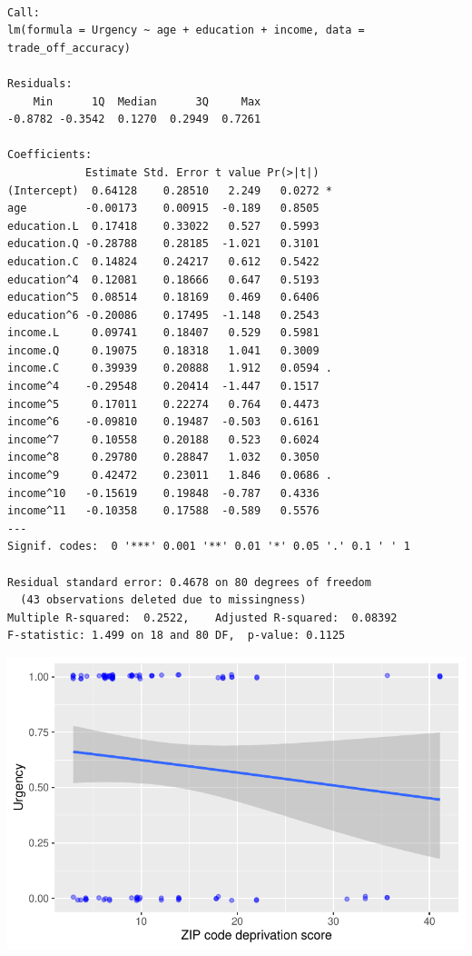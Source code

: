 \begin{verbatim}

Call:
lm(formula = Urgency ~ age + education + income, data = trade_off_accuracy)

Residuals:
    Min      1Q  Median      3Q     Max 
-0.8782 -0.3542  0.1270  0.2949  0.7261 

Coefficients:
            Estimate Std. Error t value Pr(>|t|)  
(Intercept)  0.64128    0.28510   2.249   0.0272 *
age         -0.00173    0.00915  -0.189   0.8505  
education.L  0.17418    0.33022   0.527   0.5993  
education.Q -0.28788    0.28185  -1.021   0.3101  
education.C  0.14824    0.24217   0.612   0.5422  
education^4  0.12081    0.18666   0.647   0.5193  
education^5  0.08514    0.18169   0.469   0.6406  
education^6 -0.20086    0.17495  -1.148   0.2543  
income.L     0.09741    0.18407   0.529   0.5981  
income.Q     0.19075    0.18318   1.041   0.3009  
income.C     0.39939    0.20888   1.912   0.0594 .
income^4    -0.29548    0.20414  -1.447   0.1517  
income^5     0.17011    0.22274   0.764   0.4473  
income^6    -0.09810    0.19487  -0.503   0.6161  
income^7     0.10558    0.20188   0.523   0.6024  
income^8     0.29780    0.28847   1.032   0.3050  
income^9     0.42472    0.23011   1.846   0.0686 .
income^10   -0.15619    0.19848  -0.787   0.4336  
income^11   -0.10358    0.17588  -0.589   0.5576  
---
Signif. codes:  0 '***' 0.001 '**' 0.01 '*' 0.05 '.' 0.1 ' ' 1

Residual standard error: 0.4678 on 80 degrees of freedom
  (43 observations deleted due to missingness)
Multiple R-squared:  0.2522,    Adjusted R-squared:  0.08392 
F-statistic: 1.499 on 18 and 80 DF,  p-value: 0.1125
\end{verbatim}

\includegraphics{thesis-file-ppq_files/figure-latex/img-urg-pca-3.pdf}

